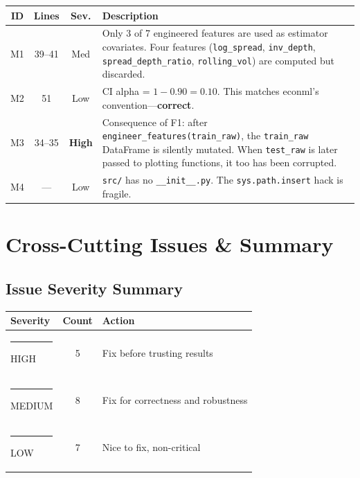 \documentclass[11pt, letterpaper]{article}
\begin{document}
\begin{center}
\begin{tabularx}{\textwidth}{c c c X}
    \toprule
    \textbf{ID} & \textbf{Lines} & \textbf{Sev.} & \textbf{Description} \\
    \midrule
    M1 & 39--41 & \textcolor{medsev}{Med} &
        Only 3 of 7 engineered features are used as estimator covariates. Four features (\texttt{log\_spread}, \texttt{inv\_depth}, \texttt{spread\_depth\_ratio}, \texttt{rolling\_vol}) are computed but discarded. \\[6pt]
    M2 & 51 & \textcolor{lowsev}{Low} &
        CI alpha = $1 - 0.90 = 0.10$. This matches econml's convention---\textbf{correct}. \\[6pt]
    M3 & 34--35 & \textcolor{highsev}{\textbf{High}} &
        Consequence of F1: after \texttt{engineer\_features(train\_raw)}, the \texttt{train\_raw} DataFrame is silently mutated. When \texttt{test\_raw} is later passed to plotting functions, it too has been corrupted. \\[6pt]
    M4 & --- & \textcolor{lowsev}{Low} &
        \texttt{src/} has no \texttt{\_\_init\_\_.py}. The \texttt{sys.path.insert} hack is fragile. \\
    \bottomrule
\end{tabularx}
\end{center}


\newpage
\section{Cross-Cutting Issues \& Summary}
\label{sec:summary}

\subsection{Issue Severity Summary}

\begin{center}
\renewcommand{\arraystretch}{1.3}
\begin{tabular}{lcl}
    \toprule
    \textbf{Severity} & \textbf{Count} & \textbf{Action} \\
    \midrule
    \textcolor{highsev}{\rule{12pt}{12pt}} \; HIGH   & 5 & Fix before trusting results \\
    \textcolor{medsev}{\rule{12pt}{12pt}} \; MEDIUM  & 8 & Fix for correctness and robustness \\
    \textcolor{lowsev}{\rule{12pt}{12pt}} \; LOW     & 7 & Nice to fix, non-critical \\
    \bottomrule
\end{tabular}
\end{center}
\end{document}
